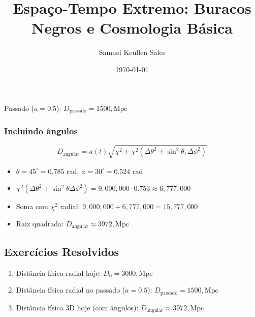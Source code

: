 \documentclass[12pt,a4paper]{article} \usepackage[utf8]{inputenc} \usepackage{amsmath, amssymb} \usepackage{geometry} \usepackage{hyperref} \usepackage{graphicx} \geometry{margin=1in} \title{Espaço-Tempo Extremo: Buracos Negros e Cosmologia Básica} \author{Samuel Keullen Sales} \date{\today}
\begin{document}
Passado ($a = 0.5$): $D_\mathrm{passado} = 1500 , \mathrm{Mpc}$

\subsubsection*{Incluindo ângulos} \begin{equation} D_\mathrm{angular} = a(t) \sqrt{\chi^2 + \chi^2 (\Delta\theta^2 + \sin^2\theta , \Delta\phi^2)} \end{equation} \begin{itemize} \item $\theta = 45^\circ = 0.785$ rad, $\phi = 30^\circ = 0.524$ rad \item $\chi^2(\Delta\theta^2 + \sin^2\theta \Delta\phi^2) = 9{,}000{,}000 \cdot 0.753 \approx 6{,}777{,}000$ \item Soma com $\chi^2$ radial: $9{,}000{,}000 + 6{,}777{,}000 = 15{,}777{,}000$ \item Raiz quadrada: $D_\mathrm{angular} \approx 3972 , \mathrm{Mpc}$ \end{itemize}

\subsection*{Exercícios Resolvidos} \begin{enumerate} \item Distância física radial hoje: $D_0 = 3000 , \mathrm{Mpc}$ \item Distância física radial no passado ($a=0.5$): $D_\mathrm{passado} = 1500 , \mathrm{Mpc}$ \item Distância física 3D hoje (com ângulos): $D_\mathrm{angular} \approx 3972 , \mathrm{Mpc}$ \end{enumerate}
\end{document}
